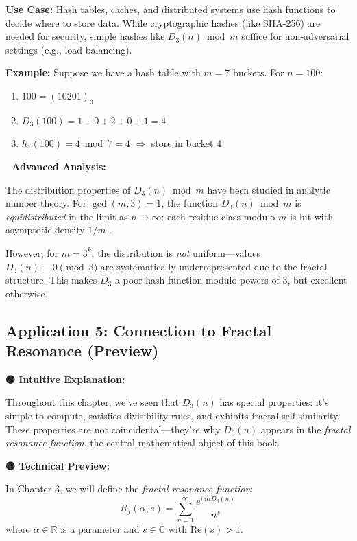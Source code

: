 \textbf{Use Case:} Hash tables, caches, and distributed systems use hash functions to decide where to store data. While cryptographic hashes (like SHA-256) are needed for security, simple hashes like $D_3(n) \bmod m$ suffice for non-adversarial settings (e.g., load balancing).

\textbf{Example:} Suppose we have a hash table with $m = 7$ buckets. For $n = 100$:
\begin{enumerate}
\item $100 = (10201)_3$
\item $D_3(100) = 1 + 0 + 2 + 0 + 1 = 4$
\item $h_7(100) = 4 \bmod 7 = 4$ $\Rightarrow$ store in bucket 4
\end{enumerate}

\textbf{🔴 Advanced Analysis:}

The distribution properties of $D_3(n) \bmod m$ have been studied in analytic number theory. For $\gcd(m, 3) = 1$, the function $D_3(n) \bmod m$ is \textit{equidistributed} in the limit as $n \to \infty$: each residue class modulo $m$ is hit with asymptotic density $1/m$ \cite{hardy1979}.

However, for $m = 3^k$, the distribution is \textit{not} uniform—values $D_3(n) \equiv 0 \pmod{3}$ are systematically underrepresented due to the fractal structure. This makes $D_3$ a poor hash function modulo powers of 3, but excellent otherwise.

\subsection{Application 5: Connection to Fractal Resonance (Preview)}

\textbf{🟢 Intuitive Explanation:}

Throughout this chapter, we've seen that $D_3(n)$ has special properties: it's simple to compute, satisfies divisibility rules, and exhibits fractal self-similarity. These properties are not coincidental—they're why $D_3(n)$ appears in the \textit{fractal resonance function}, the central mathematical object of this book.

\textbf{🟡 Technical Preview:}

In Chapter 3, we will define the \textit{fractal resonance function}:
\begin{equation}
R_f(\alpha, s) = \sum_{n=1}^{\infty} \frac{e^{i\pi\alpha D_3(n)}}{n^s}
\end{equation}
where $\alpha \in \mathbb{R}$ is a parameter and $s \in \mathbb{C}$ with $\text{Re}(s) > 1$.

